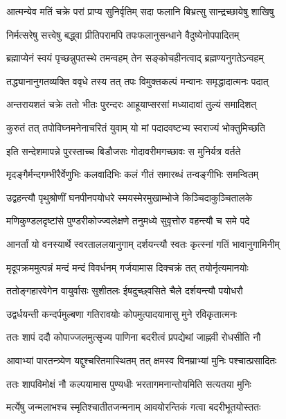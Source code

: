 \twolineshloka
{आत्मन्येव मतिं चक्रे परां प्राप्य सुनिर्वृतिम्}
{सदा फलानि बिभ्रत्सु सान्द्रच्छायेषु शाखिषु} %

\twolineshloka
{निर्मत्सरेषु सत्त्वेषु बद्ध्वा प्रीतिपरामपि}
{तपःफलानुसन्धाने वैदुष्येनोपपादितम्} %

\twolineshloka
{ब्रह्माप्येनं स्वयं पृच्छन्नुपतस्थे तमन्वहम्}
{तेन सङ्कोचहीनत्वाद् ब्रह्मण्यनुगतेऽन्वहम्} %

\twolineshloka
{तद्ध्यानानुगतव्यक्ति ववृधे तस्य तत् तपः}
{विमुक्तकल्पं मन्वानः समृद्धादात्मनः पदात्} %

\twolineshloka
{अन्तरायशतं चक्रे ततो भीतः पुरन्दरः}
{आहूयाप्सरसां मध्यादावां तुल्यं समादिशत्} %

\twolineshloka
{कुरुतं तत् तपोविघ्नमनेनाचरितं युवाम्}
{यो मां पदादवष्टभ्य स्वराज्यं भोक्तुमिच्छति} %

\twolineshloka
{इति सन्देशमापन्ने पुरस्ताच्च बिडौजसः}
{गोदावरीमगच्छावः स मुनिर्यत्र वर्तते} %

\twolineshloka
{मृदङ्गैर्मन्दगम्भीरैर्वेणुभिः कलवादिभिः}
{कलं गीतं समारब्धं तन्वङ्गीभिः समन्वितम्} %

\twolineshloka
{उद्वहन्त्यौ पृथुश्रोणीं घनपीनपयोधरे}
{स्मयस्मेरमुखाम्भोजे किञ्चिदाकुञ्चितालके} %

\twolineshloka
{मणिकुण्डलदृष्टांसे पुण्डरीकोज्ज्वलेक्षणे}
{तनुमध्ये सुवृत्तोरु वहन्त्यौ च समे पदे} %

\twolineshloka
{आनर्तां यो वनस्यार्थे स्वरताललयानुगाम्}
{दर्शयन्त्यौ स्वतः कृत्स्नां गतिं भावानुगामिनीम्} %

\twolineshloka
{मृदूपक्रममुत्पन्नं मन्दं मन्दं विवर्धनम्}
{गर्जयामास दिक्चक्रं तत् तयोर्नृत्यमानयोः} %

\twolineshloka
{ततोङ्गहारवेगेन वायुर्वासः सुशीतलः}
{ईषदुच्छ्वसिते चैले दर्शयन्त्यौ पयोधरौ} %

\twolineshloka
{उद्वर्धयन्ती कन्दर्पमुल्बणा गतिरावयोः}
{कोपमुत्पादयामासु मुने रविकृतात्मनः} %

\twolineshloka
{ततः शापं ददौ कोपाज्जलमुत्सृज्य पाणिना}
{बदरीत्वं प्रपद्येथां जाह्नवी रोधसीति नौ} %

\twolineshloka
{आवाभ्यां पारतन्त्र्येण यद्दुश्चरितमास्थितम्}
{तत् क्षमस्व विनम्राभ्यां मुनिः पश्चात्प्रसादितः} %

\twolineshloka
{ततः शापविमोक्षं नौ कल्पयामास पुण्यधीः}
{भरतागमनान्तोयमिति सत्यतया मुनिः} %

\twolineshloka
{मर्त्येषु जन्मलाभश्च स्मृतिश्चातीतजन्मनाम्}
{आवयोरन्तिकं गत्वा बदरीभूतयोस्ततः} %

